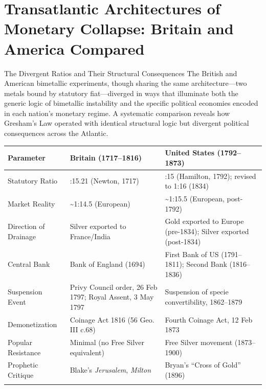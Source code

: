 \documentclass[
  ignorenonframetext,
]{beamer}
\author{\texorpdfstring{}{}}
\date{}
\newcounter{none} %
\begin{document}
\section{Transatlantic Architectures of Monetary Collapse: Britain and
America
Compared}\label{transatlantic-architectures-of-monetary-collapse-britain-and-america-compared}

\begin{frame}{The Divergent Ratios and Their Structural Consequences}
\protect{}\label{the-divergent-ratios-and-their-structural-consequences}
The British and American bimetallic experiments, though sharing the same
architecture---two metals bound by statutory fiat---diverged in ways
that illuminate both the generic logic of bimetallic instability and the
specific political economies encoded in each nation's monetary regime. A
systematic comparison reveals how Gresham's Law operated with identical
structural logic but divergent political consequences across the
Atlantic.

{\def\LTcaptype{none} %
\begin{longtable}[]{@{}
  >{\raggedright\arraybackslash}p{}
  >{\raggedright\arraybackslash}p{}
  >{\raggedright\arraybackslash}p{}@{}}
\toprule\noalign{}
\begin{minipage}[b]{\linewidth}\raggedright
Parameter
\end{minipage} & \begin{minipage}[b]{\linewidth}\raggedright
Britain (1717--1816)
\end{minipage} & \begin{minipage}[b]{\linewidth}\raggedright
United States (1792--1873)
\end{minipage} \\
\midrule\noalign{}
\endhead
Statutory Ratio & 1:15.21 (Newton, 1717) & 1:15 (Hamilton, 1792);
revised to 1:16 (1834) \\
Market Reality & \textasciitilde1:14.5 (European) &
\textasciitilde1:15.5 (European, post-1792) \\
Direction of Drainage & Silver exported to France/India & Gold exported
to Europe (pre-1834); Silver exported (post-1834) \\
Central Bank & Bank of England (1694) & First Bank of US (1791--1811);
Second Bank (1816--1836) \\
Suspension Event & Privy Council order, 26 Feb 1797; Royal Assent, 3 May
1797 & Suspension of specie convertibility, 1862--1879 \\
Demonetization & Coinage Act 1816 (56 Geo. III c.68) & Fourth Coinage
Act, 12 Feb 1873 \\
Popular Resistance & Minimal (no Free Silver equivalent) & Free Silver
movement (1873--1900) \\
Prophetic Critique & Blake's \emph{Jerusalem}, \emph{Milton} & Bryan's
``Cross of Gold'' (1896) \\
\bottomrule\noalign{}
\end{longtable}
}


\end{frame}
\end{document}
